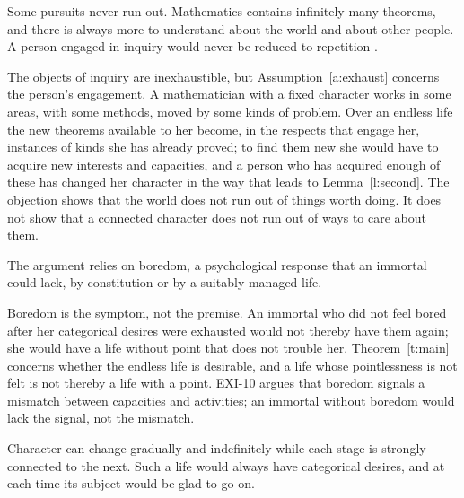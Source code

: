 \documentclass{situationist-preprint}
\begin{document}
\begin{objection}\label{o:open}
Some pursuits never run out. Mathematics contains infinitely many theorems, and there is always more to understand about the world and about other people. A person engaged in inquiry would never be reduced to repetition \citep{Chappell2009,BortolottiNagasawa2009}.
\end{objection}

\begin{reply}
The objects of inquiry are inexhaustible, but Assumption~\ref{a:exhaust} concerns the person's engagement. A mathematician with a fixed character works in some areas, with some methods, moved by some kinds of problem. Over an endless life the new theorems available to her become, in the respects that engage her, instances of kinds she has already proved; to find them new she would have to acquire new interests and capacities, and a person who has acquired enough of these has changed her character in the way that leads to Lemma~\ref{l:second}. The objection shows that the world does not run out of things worth doing. It does not show that a connected character does not run out of ways to care about them.
\end{reply}

\begin{objection}\label{o:bored}
The argument relies on boredom, a psychological response that an immortal could lack, by constitution or by a suitably managed life.
\end{objection}

\begin{reply}
Boredom is the symptom, not the premise. An immortal who did not feel bored after her categorical desires were exhausted would not thereby have them again; she would have a life without point that does not trouble her. Theorem~\ref{t:main} concerns whether the endless life is desirable, and a life whose pointlessness is not felt is not thereby a life with a point. EXI-10 argues that boredom signals a mismatch between capacities and activities; an immortal without boredom would lack the signal, not the mismatch.
\end{reply}

\begin{objection}\label{o:grad}
Character can change gradually and indefinitely while each stage is strongly connected to the next. Such a life would always have categorical desires, and at each time its subject would be glad to go on.
\end{objection}
\end{document}
